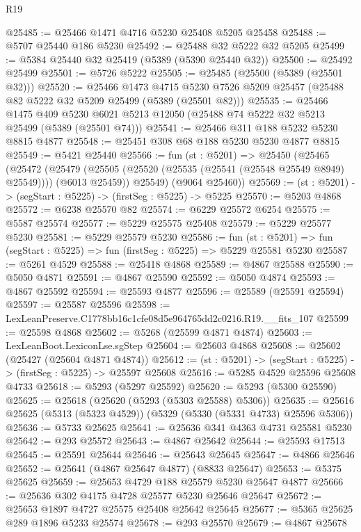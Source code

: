 \begin{lexlean}{R19}
\begin{coremodule}
@25485 := @25466 @1471 @4716 @5230 @25408 @5205 @25458
@25488 := @5707 @25440 @186 @5230
@25492 := @25488 @32 @5222 @32 @5205
@25499 := @5384 @25440 @32 @25419 (@5389 (@5390 @25440 @32))
@25500 := @25492 @25499
@25501 := @5726 @5222
@25505 := @25485 (@25500 (@5389 (@25501 @32)))
@25520 := @25466
    @1473
    @4715
    @5230
    @7526
    @5209
    @25457
    (@25488 @82 @5222 @32 @5209 @25499 (@5389 (@25501 @82)))
@25535 := @25466
    @1475
    @409
    @5230
    @6021
    @5213
    @12050
    (@25488 @74 @5222 @32 @5213 @25499 (@5389 (@25501 @74)))
@25541 := @25466 @311 @188 @5232 @5230 @8815 @4877
@25548 := @25451 @308 @68 @188 @5230 @5230 @4877 @8815
@25549 := @5421 @25440
@25566 := fun (st : @5201) =>
  @25450
    (@25465
      (@25472
        (@25479 (@25505 (@25520 (@25535 (@25541 (@25548 @25549 @8949) @25549)))) (@6013 @25459))
        @25549)
      (@9064 @25460))
@25569 := (st : @5201) -> (segStart : @5225) -> (firstSeg : @5225) -> @5225
@25570 := @5203 @4868
@25572 := @6238 @25570 @82
@25574 := @6229 @25572 @6254
@25575 := @5587 @25574
@25577 := @5229 @25575 @25408
@25579 := @5229 @25577 @5230
@25581 := @5229 @25579 @5230
@25586 := fun (st : @5201) => fun (segStart : @5225) => fun (firstSeg : @5225) => @5229 @25581 @5230
@25587 := @5261 @4529
@25588 := @25418 @4868
@25589 := @4867 @25588
@25590 := @5050 @4871
@25591 := @4867 @25590
@25592 := @5050 @4874
@25593 := @4867 @25592
@25594 := @25593 @4877
@25596 := @25589 (@25591 @25594)
@25597 := @25587 @25596
@25598 := LexLeanPreserve.C1778bb16c1cfe08d5e964765dd2c0216.R19.__fits_107
@25599 := @25598 @4868
@25602 := @5268 (@25599 @4871 @4874)
@25603 := LexLeanBoot.LexiconLse.sgStep
@25604 := @25603 @4868
@25608 := @25602 (@25427 (@25604 @4871 @4874))
@25612 := (st : @5201) -> (segStart : @5225) -> (firstSeg : @5225) -> @25597 @25608
@25616 := @5285 @4529 @25596 @25608 @4733
@25618 := @5293 (@5297 @25592)
@25620 := @5293 (@5300 @25590)
@25625 := @25618 (@25620 (@5293 (@5303 @25588) @5306))
@25635 := @25616 @25625 (@5313 (@5323 @4529)) (@5329 (@5330 (@5331 @4733) @25596 @5306))
@25636 := @5733 @25625
@25641 := @25636 @341 @4363 @4731 @25581 @5230
@25642 := @293 @25572
@25643 := @4867 @25642
@25644 := @25593 @17513
@25645 := @25591 @25644
@25646 := @25643 @25645
@25647 := @4866 @25646
@25652 := @25641 (@4867 @25647 @4877) (@8833 @25647)
@25653 := @5375 @25625
@25659 := @25653 @4729 @188 @25579 @5230 @25647 @4877
@25666 := @25636 @302 @4175 @4728 @25577 @5230 @25646 @25647
@25672 := @25653 @1897 @4727 @25575 @25408 @25642 @25645
@25677 := @5365 @25625 @289 @1896 @5233 @25574
@25678 := @293 @25570
@25679 := @4867 @25678

\end{coremodule}
\end{lexlean}
